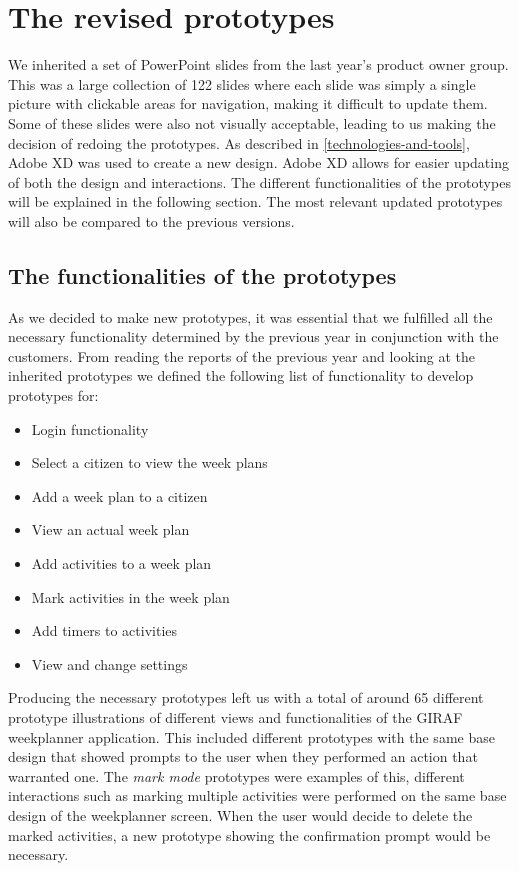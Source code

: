 \section{The revised prototypes}\label{prototype-comp}
We inherited a set of PowerPoint slides from the last year's product owner group.
This was a large collection of 122 slides where each slide was simply a single picture with clickable areas for navigation, making it difficult to update them.
Some of these slides were also not visually acceptable, leading to us making the decision of redoing the prototypes.
As described in \autoref{technologies-and-tools}, Adobe XD was used to create a new design.
Adobe XD allows for easier updating of both the design and interactions.
The different functionalities of the prototypes will be explained in the following section.
The most relevant updated prototypes will also be compared to the previous versions.

\subsection{The functionalities of the prototypes}
As we decided to make new prototypes, it was essential that we fulfilled all the necessary functionality determined by the previous year in conjunction with the customers.
From reading the reports of the previous year and looking at the inherited prototypes we defined the following list of functionality to develop prototypes for:
\begin{itemize}
    \item Login functionality
    \item Select a citizen to view the week plans
    \item Add a week plan to a citizen
    \item View an actual week plan
    \item Add activities to a week plan
    \item Mark activities in the week plan
    \item Add timers to activities
    \item View and change settings
\end{itemize}
Producing the necessary prototypes left us with a total of around 65 different prototype illustrations of different views and functionalities of the GIRAF weekplanner application.
This included different prototypes with the same base design that showed prompts to the user when they performed an action that warranted one.
The \textit{mark mode} prototypes were examples of this, different interactions such as marking multiple activities were performed on the same base design of the weekplanner screen.
When the user would decide to delete the marked activities, a new prototype showing the confirmation prompt would be necessary.

